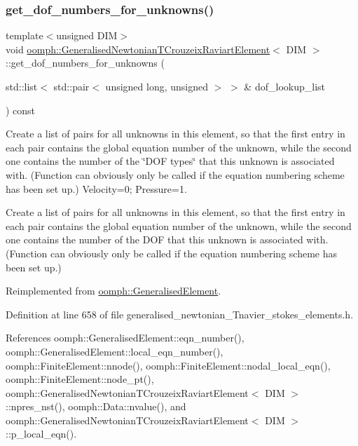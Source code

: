 \subsubsection{\texorpdfstring{get\+\_\+dof\+\_\+numbers\+\_\+for\+\_\+unknowns()}{get\_dof\_numbers\_for\_unknowns()}}
{\footnotesize\ttfamily template$<$unsigned D\+IM$>$ \\
void \hyperlink{classoomph_1_1GeneralisedNewtonianTCrouzeixRaviartElement}{oomph\+::\+Generalised\+Newtonian\+T\+Crouzeix\+Raviart\+Element}$<$ D\+IM $>$\+::get\+\_\+dof\+\_\+numbers\+\_\+for\+\_\+unknowns (\begin{DoxyParamCaption}\item[{std\+::list$<$ std\+::pair$<$ unsigned long, unsigned $>$ $>$ \&}]{dof\+\_\+lookup\+\_\+list }\end{DoxyParamCaption}) const\hspace{0.3cm}{\ttfamily [virtual]}}



Create a list of pairs for all unknowns in this element, so that the first entry in each pair contains the global equation number of the unknown, while the second one contains the number of the \char`\"{}\+D\+O\+F types\char`\"{} that this unknown is associated with. (Function can obviously only be called if the equation numbering scheme has been set up.) Velocity=0; Pressure=1. 

Create a list of pairs for all unknowns in this element, so that the first entry in each pair contains the global equation number of the unknown, while the second one contains the number of the D\+OF that this unknown is associated with. (Function can obviously only be called if the equation numbering scheme has been set up.) 

Reimplemented from \hyperlink{classoomph_1_1GeneralisedElement_a069f59bfc3e607a5bebba52c6314d777}{oomph\+::\+Generalised\+Element}.



Definition at line 658 of file generalised\+\_\+newtonian\+\_\+\+Tnavier\+\_\+stokes\+\_\+elements.\+h.



References oomph\+::\+Generalised\+Element\+::eqn\+\_\+number(), oomph\+::\+Generalised\+Element\+::local\+\_\+eqn\+\_\+number(), oomph\+::\+Finite\+Element\+::nnode(), oomph\+::\+Finite\+Element\+::nodal\+\_\+local\+\_\+eqn(), oomph\+::\+Finite\+Element\+::node\+\_\+pt(), oomph\+::\+Generalised\+Newtonian\+T\+Crouzeix\+Raviart\+Element$<$ D\+I\+M $>$\+::npres\+\_\+nst(), oomph\+::\+Data\+::nvalue(), and oomph\+::\+Generalised\+Newtonian\+T\+Crouzeix\+Raviart\+Element$<$ D\+I\+M $>$\+::p\+\_\+local\+\_\+eqn().



